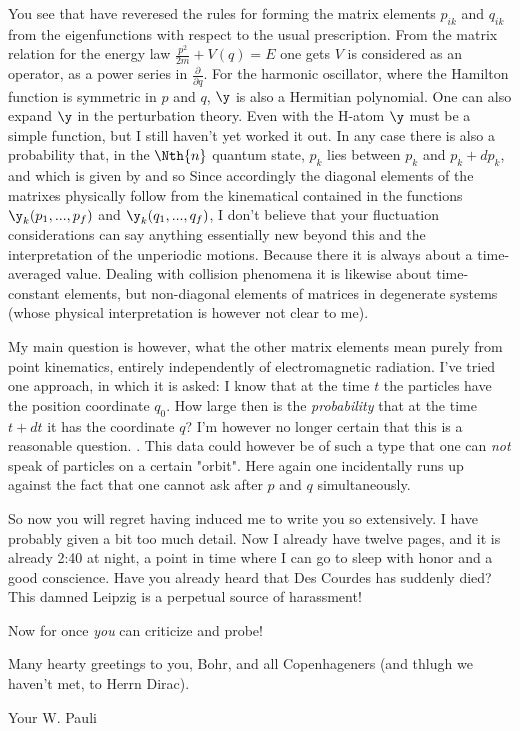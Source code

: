 You see that have reveresed the rules for forming the matrix elements $p_{ik}$ and $q_{ik}$ from the eigenfunctions with respect to the usual prescription. From the matrix relation for the energy law $\frac{p^2}{2m}+V(q)=E$ one gets
$V$ is considered as an operator, as a power series in $\frac{\partial}{\partial q}$. For the harmonic oscillator, where the Hamilton function is symmetric in $p$ and $q$, $\y$ is also a Hermitian polynomial. One can also expand $\y$ in the perturbation theory. Even with the H-atom $\y$ must be a simple function, but I still haven't yet worked it out. In any case there is also a probability that, in the $\Nth{n}$ quantum state, $p_k$ lies between $p_k$ and $p_k+dp_k$, and which is given by
and so
Since accordingly the diagonal elements of the matrixes physically follow from the kinematical  contained in the functions $\y_k(p_1,...,p_f)$ and $\y_k(q_1,...,q_f)$, I don't believe that your fluctuation considerations can say anything essentially new beyond this and the interpretation of the unperiodic motions. Because there it is always about a time-averaged value. Dealing with collision phenomena it is likewise about time-constant elements, but non-diagonal elements of matrices in degenerate systems (whose physical interpretation is however not clear to me).

My main question is however, what the other matrix elements mean purely from point kinematics, entirely independently of electromagnetic radiation. I've tried one approach, in which it is asked: I know that at the time $t$ the particles have the position coordinate $q_0$. How large then is the \textit{probability} that at the time $t+dt$ it has the coordinate $q$? I'm however no longer certain that this is a reasonable question. . This data could however be of such a type that one can \textit{not} speak of particles on a certain "orbit". Here again one incidentally runs up against the fact that one cannot ask after $p$ and $q$ simultaneously.

So now you will regret having induced me to write you so extensively. I have probably given a bit too much detail. Now I already have twelve pages, and it is already 2:40 at night, a point in time where I can go to sleep with honor and a good conscience. Have you already heard that Des Courdes has suddenly died? This damned Leipzig is a perpetual source of harassment!

 Now for once \textit{you} can criticize and probe!

Many hearty greetings to you, Bohr, and all Copenhageners (and thlugh we haven't met, to Herrn Dirac).

Your W. Pauli